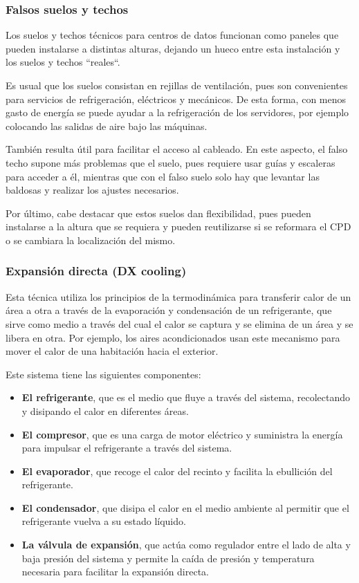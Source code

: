\subsubsection{Falsos suelos y techos} \label{suelos-techos}

Los suelos y techos técnicos para centros de datos funcionan como paneles que pueden instalarse a distintas alturas, dejando un hueco entre esta instalación y los suelos y techos ``reales``.

Es usual que los suelos consistan en rejillas de ventilación, pues son convenientes para servicios de refrigeración, eléctricos y mecánicos. De esta forma, con menos gasto de energía se puede ayudar a la refrigeración de los servidores, por ejemplo colocando las salidas de aire bajo las máquinas.

También resulta útil para facilitar el acceso al cableado. En este aspecto, el falso techo supone más problemas que el suelo, pues requiere usar guías y escaleras para acceder a él, mientras que con el falso suelo solo hay que levantar las baldosas y realizar los ajustes necesarios.

Por último, cabe destacar que estos suelos dan flexibilidad, pues pueden instalarse a la altura que se requiera y pueden reutilizarse si se reformara el CPD o se cambiara la localización del mismo.

\subsubsection{Expansión directa (DX cooling)}

Esta técnica utiliza los principios de la termodinámica para transferir calor de un área a otra a través de la evaporación y condensación de un refrigerante, que sirve como medio a través del cual el calor se captura y se elimina de un área y se libera en otra. Por ejemplo, los aires acondicionados usan este mecanismo para mover el calor de una habitación hacia el exterior.

Este sistema tiene las siguientes componentes:

\begin{itemize}
    \item {\textbf{El refrigerante}}, que es el medio que fluye a través del sistema, recolectando y disipando el calor en diferentes áreas.
    \item \textbf{El compresor}, que es una carga de motor eléctrico y suministra la energía para impulsar el refrigerante a través del sistema.
    \item \textbf{El evaporador}, que recoge el calor del recinto y facilita la ebullición del refrigerante.
    \item \textbf{El condensador}, que disipa el calor en el medio ambiente al permitir que el refrigerante vuelva a su estado líquido.
    \item \textbf{La válvula de expansión}, que actúa como regulador entre el lado de alta y baja presión del sistema y permite la caída de presión y temperatura necesaria para facilitar la expansión directa.
\end{itemize}



